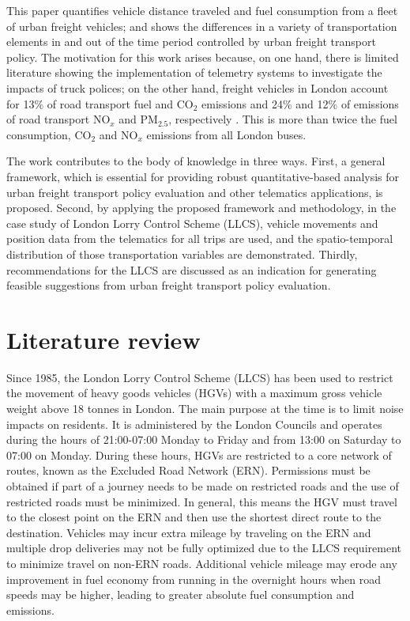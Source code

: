 \documentclass[preprint,12pt,3p]{elsarticle}
\begin{document}
 This paper quantifies vehicle distance traveled and fuel consumption from a fleet of urban freight vehicles; and shows the differences in a variety of transportation elements in and out of the time period controlled by urban freight transport policy. The motivation for this work arises because, on one hand, there is limited literature showing the implementation of telemetry systems to investigate the impacts of truck polices; on the other hand, freight vehicles in London account for 13$\%$ of road transport fuel and CO$_{2}$ emissions \cite{RN164} and 24$\%$ and 12$\%$ of emissions of road transport NO$_{x}$ and PM$_{2.5}$, respectively \cite{RN165}. This is more than twice the fuel consumption, CO$_{2}$ and NO$_{x}$ emissions from all London buses.

The work contributes to the body of knowledge in three ways. First, a general framework, which is essential for providing robust quantitative-based analysis for urban freight transport policy evaluation and other telematics applications, is proposed. Second, by applying the proposed framework and methodology, in the case study of London Lorry Control Scheme (LLCS), vehicle movements and position data from the telematics for all trips are used, and the spatio-temporal distribution of those transportation variables are demonstrated. Thirdly, recommendations for the LLCS are discussed as an indication for generating feasible suggestions from urban freight transport policy evaluation. 


\section{Literature review}
\label{LR}

Since 1985, the London Lorry Control Scheme (LLCS) has been used to restrict the movement of heavy goods vehicles (HGVs) with a maximum gross vehicle weight above 18 tonnes in London. The main purpose at the time is to limit noise impacts on residents. It is administered by the London Councils and operates during the hours of 21:00-07:00 Monday to Friday and from 13:00 on Saturday to 07:00 on Monday. During these hours, HGVs are restricted to a core network of routes, known as the Excluded Road Network (ERN). Permissions must be obtained if part of a journey needs to be made on restricted roads and the use of restricted roads must be minimized. In general, this means the HGV must travel to the closest point on the ERN and then use the shortest direct route to the destination. Vehicles may incur extra mileage by traveling on the ERN and multiple drop deliveries may not be fully optimized due to the LLCS requirement to minimize travel on non-ERN roads. Additional vehicle mileage may erode any improvement in fuel economy from running in the overnight hours when road speeds may be higher, leading to greater absolute fuel consumption and emissions.
\end{document}
